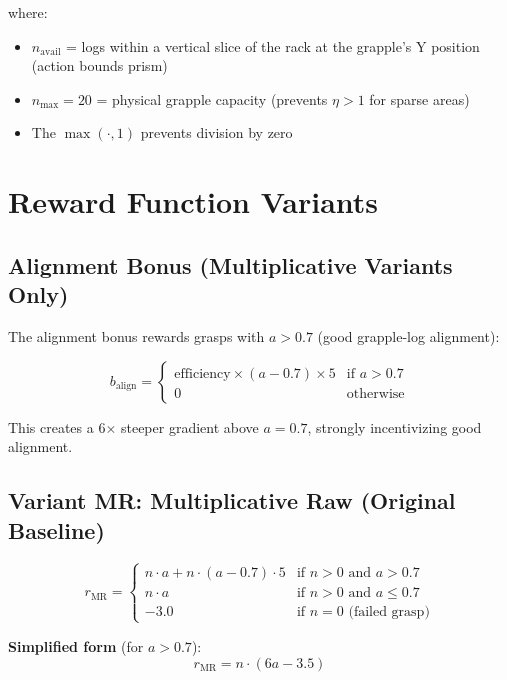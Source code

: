 \documentclass[11pt]{article}
\begin{document}
where:
\begin{itemize}
    \item $n_{\text{avail}}$ = logs within a vertical slice of the rack at the grapple's Y position (action bounds prism)
    \item $n_{\text{max}} = 20$ = physical grapple capacity (prevents $\eta > 1$ for sparse areas)
    \item The $\max(\cdot, 1)$ prevents division by zero
\end{itemize}

\section{Reward Function Variants}

\subsection{Alignment Bonus (Multiplicative Variants Only)}

The alignment bonus rewards grasps with $a > 0.7$ (good grapple-log alignment):

\begin{equation}
    b_{\text{align}} = \begin{cases}
        \text{efficiency} \times (a - 0.7) \times 5 & \text{if } a > 0.7 \\
        0 & \text{otherwise}
    \end{cases}
\end{equation}

This creates a 6$\times$ steeper gradient above $a = 0.7$, strongly incentivizing good alignment.

\subsection{Variant MR: Multiplicative Raw (Original Baseline)}

\begin{equation}
    r_{\text{MR}} = \begin{cases}
        n \cdot a + n \cdot (a - 0.7) \cdot 5 & \text{if } n > 0 \text{ and } a > 0.7 \\
        n \cdot a & \text{if } n > 0 \text{ and } a \leq 0.7 \\
        -3.0 & \text{if } n = 0 \text{ (failed grasp)}
    \end{cases}
\end{equation}

\textbf{Simplified form} (for $a > 0.7$):
\begin{equation}
    r_{\text{MR}} = n \cdot (6a - 3.5)
\end{equation}
\end{document}
